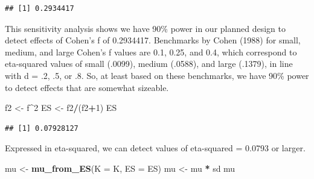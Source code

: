 \documentclass[]{book}
\newenvironment{Shaded}{\begin{snugshade}}{\end{snugshade}}
\newcommand{\CommentTok}[1]{\textcolor[rgb]{0.56,0.35,0.01}{\textit{#1}}}
\newcommand{\DataTypeTok}[1]{\textcolor[rgb]{0.13,0.29,0.53}{#1}}
\newcommand{\DecValTok}[1]{\textcolor[rgb]{0.00,0.00,0.81}{#1}}
\newcommand{\FloatTok}[1]{\textcolor[rgb]{0.00,0.00,0.81}{#1}}
\newcommand{\KeywordTok}[1]{\textcolor[rgb]{0.13,0.29,0.53}{\textbf{#1}}}
\newcommand{\NormalTok}[1]{#1}
\newcommand{\OperatorTok}[1]{\textcolor[rgb]{0.81,0.36,0.00}{\textbf{#1}}}
\newcommand{\StringTok}[1]{\textcolor[rgb]{0.31,0.60,0.02}{#1}}
\begin{document}
\begin{Shaded}
\end{Shaded}

\begin{verbatim}
## [1] 0.2934417
\end{verbatim}

This sensitivity analysis shows we have 90\% power in our planned design to detect effects of Cohen's f of 0.2934417. Benchmarks by Cohen (1988) for small, medium, and large Cohen's f values are 0.1, 0.25, and 0.4, which correspond to eta-squared values of small (.0099), medium (.0588), and large (.1379), in line with d = .2, .5, or .8. So, at least based on these benchmarks, we have 90\% power to detect effects that are somewhat sizeable.

\begin{Shaded}
\begin{Highlighting}[]
\NormalTok{f2 <-}\StringTok{ }\NormalTok{f}\OperatorTok{^}\DecValTok{2}
\NormalTok{ES <-}\StringTok{ }\NormalTok{f2}\OperatorTok{/}\NormalTok{(f2}\OperatorTok{+}\DecValTok{1}\NormalTok{)}
\NormalTok{ES}
\end{Highlighting}
\end{Shaded}

\begin{verbatim}
## [1] 0.07928127
\end{verbatim}

Expressed in eta-squared, we can detect values of eta-squared = 0.0793 or larger.

\begin{Shaded}
\begin{Highlighting}[]
\NormalTok{mu <-}\StringTok{ }\KeywordTok{mu_from_ES}\NormalTok{(}\DataTypeTok{K =}\NormalTok{ K, }\DataTypeTok{ES =}\NormalTok{ ES)}
\NormalTok{mu <-}\StringTok{ }\NormalTok{mu }\OperatorTok{*}\StringTok{ }\NormalTok{sd}
\NormalTok{mu}
\end{Highlighting}
\end{Shaded}
\end{document}
